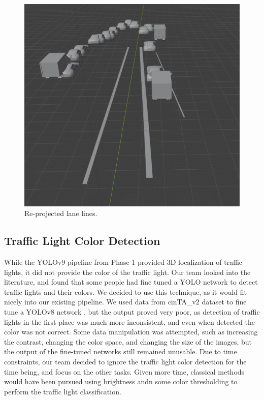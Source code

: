 \begin{figure}
    \centering
    \includegraphics[width=0.95\linewidth]{images/reprojected_lanes.png}
    \caption{Re-projected lane lines.}
    \label{fig:reprojected_lane_lines}
\end{figure}

\subsection{Traffic Light Color Detection}
While the YOLOv9 pipeline from Phase 1 provided 3D localization of traffic lights, it did not provide the color of the traffic light. Our team looked into the literature, and found that some people had fine tuned a YOLO network to detect traffic lights and their colors. We decided to use this technique, as it would fit nicely into our existing pipeline. We used data from cinTA\_v2 dataset to fine tune a YOLOv8 network \cite{CintaV2Dataset}, but the output proved very poor, as detection of traffic lights in the first place was much more inconsistent, and even when detected the color was not correct. Some data manipulation was attempted, such as increasing the contrast, changing the color space, and changing the size of the images, but the output of the fine-tuned networks still remained unusable. Due to time constraints, our team decided to ignore the traffic light color detection for the time being, and focus on the other tasks. Given more time, classical methods would have been pursued using brightness andn some color thresholding to perform the traffic light classification.


